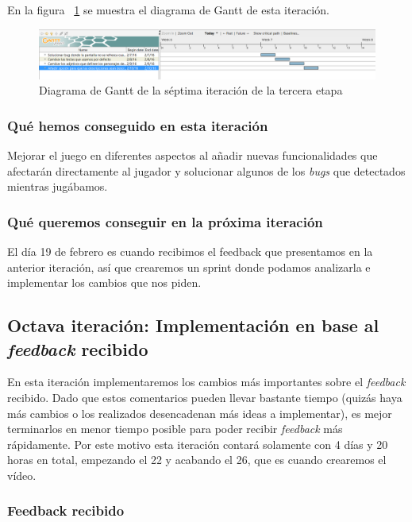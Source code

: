 En la figura ~\ref{fig:sec3it7} se muestra el diagrama de Gantt de esta iteración.

\begin{figure}
    \includegraphics[width=\textwidth,height=\textheight,keepaspectratio]{./img/sec3it7.png}
  \caption{Diagrama de Gantt de la séptima iteración de la tercera etapa}
  \label{fig:sec3it7}
\end{figure}

\subsubsection{Qué hemos conseguido en esta iteración}

Mejorar el juego en diferentes aspectos al añadir nuevas funcionalidades que afectarán directamente al jugador y solucionar algunos de los \textit{bugs} que detectados mientras jugábamos.

\subsubsection{Qué queremos conseguir en la próxima iteración}

El día 19 de febrero es cuando recibimos el feedback que presentamos en la anterior iteración, así que crearemos un sprint donde podamos analizarla e implementar los cambios que nos piden.

\subsection{Octava iteración: Implementación en base al \textit{feedback} recibido}

En esta iteración implementaremos los cambios más importantes sobre el \textit{feedback} recibido. Dado que estos comentarios pueden llevar bastante tiempo (quizás haya más cambios o los realizados desencadenan más ideas a implementar), es mejor terminarlos en menor tiempo posible para poder recibir \textit{feedback} más rápidamente.
Por este motivo esta iteración contará solamente con 4 días y 20 horas en total, empezando el 22 y acabando el 26, que es cuando crearemos el vídeo.

\subsubsection{Feedback recibido}

